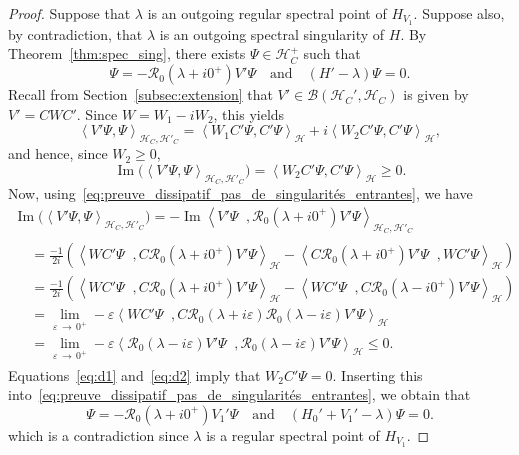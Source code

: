 \documentclass[AHL,Unicode,longabstracts,published]{cedram}
\newcommand{\Hi}{\mathcal{H}}
\newcommand{\scal}[2]{\left\langle{#1} \middle., {#2}\right\rangle}
\newcommand{\Res}{\mathcal{R}}
\newcommand{\clB}{\mathcal{B}}
\DeclareMathOperator{\im}{Im}
\newcommand{\Hi}{\mathcal{H}}
\DeclareMathOperator{\im}{Im}
\begin{document}
\begin{proof}
Suppose that $\lambda$ is an outgoing regular spectral point of $H_{V_1}$. Suppose also, by contradiction, that $\lambda$ is an outgoing spectral singularity of $H$. By Theorem~\ref{thm:spec_sing}, there exists $\Psi\in\Hi_C^+$ such that
\begin{equation}\label{eq:preuve_dissipatif_pas_de_singularités_entrantes}
\Psi=-\Res_0\left(\lambda+i0^+\right)V'\Psi \quad \text{and} \quad (H'-\lambda)\Psi=0.
\end{equation}
Recall from Section~\ref{subsec:extension} that $V'\in\clB(\Hi_C',\Hi_C)$ is given by $V'=CWC'$. Since $W=W_1-iW_2$, this yields
\begin{equation*}
\left\langle V'\Psi,\Psi\right\rangle_{\Hi_C,\Hi'_C}=\left\langle W_1 C'\Psi, C'\Psi\right\rangle_\Hi+i\left\langle W_2 C'\Psi, C'\Psi\right\rangle_\Hi,
\end{equation*}
and hence, since $W_2\ge0$,
\begin{equation}\label{eq:d1}
\im\big(\left\langle V'\Psi,\Psi\right\rangle_{\Hi_C,\Hi'_C}\big)=\left\langle W_2C'\Psi, C'\Psi\right\rangle_\Hi\geq 0.
\end{equation}
Now, using~\eqref{eq:preuve_dissipatif_pas_de_singularités_entrantes}, we have
\begin{multline}\label{eq:d2}
\im\big(\left\langle V'\Psi,\Psi\right\rangle_{\Hi_C,\Hi'_C}\big)=-\im\scal{V'\Psi}{\Res_0\left(\lambda+i0^+\right)V'\Psi}_{\Hi_C,\Hi'_C} \\
\begin{aligned}
&=\frac{-1}{2i}\left(\scal{W C'\Psi}{C\Res_0\left(\lambda+i0^+\right)V'\Psi}_\Hi-\scal{C\Res_0\left(\lambda+i0^+\right)V'\Psi}{W C'\Psi}_\Hi\right)\\
&=\frac{-1}{2i}\left(\scal{W C'\Psi}{C\Res_0\left(\lambda+i0^+\right)V'\Psi}_\Hi-\scal{W C'\Psi}{C\Res_0\left(\lambda-i0^+\right)V'\Psi}_\Hi\right)\\
&=\lim_{\varepsilon\,\rightarrow\,0^+}-\varepsilon
\scal{W C'\Psi}{C\Res_0(\lambda+i\varepsilon)\Res_0(\lambda-i\varepsilon)V'\Psi}_\Hi\\
&=\lim_{\varepsilon\,\rightarrow\,0^+}-\varepsilon\scal{\Res_0(\lambda-i\varepsilon)V'\Psi}{\Res_0(\lambda-i\varepsilon)V'\Psi}_\Hi\leq 0. 
\end{aligned}
\end{multline}
Equations~\eqref{eq:d1} and~\eqref{eq:d2} imply that $W_2C'\Psi=0$. Inserting this into~\eqref{eq:preuve_dissipatif_pas_de_singularités_entrantes}, we obtain that
\begin{equation*}
\Psi=-\Res_0\left(\lambda+i0^+\right)V_1'\Psi \quad\text{and}\quad \left(H_0'+V_1'-\lambda\right)\Psi=0.
\end{equation*}
which is a contradiction since $\lambda$ is a regular spectral point of $H_{V_1}$.
\end{proof}
\end{document}

